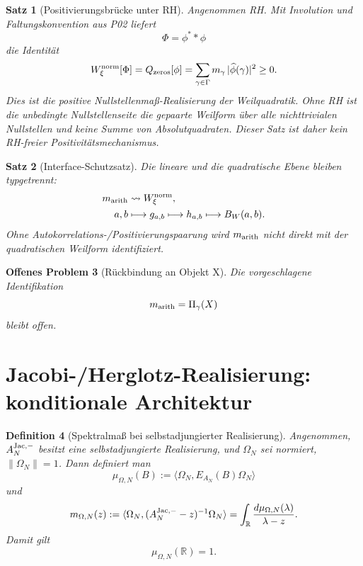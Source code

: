 \documentclass[11pt,a4paper]{amsart}
\newtheorem{theorem}{Satz}[section]
\newtheorem{definition}[theorem]{Definition}
\newtheorem{openproblem}[theorem]{Offenes Problem}
\begin{document}
\begin{theorem}[Positivierungsbrücke unter RH]
\label{thm:positivity-bridge}
Angenommen RH. Mit Involution und Faltungskonvention aus P02 liefert
\[
  \Phi=\phi^\ast *\phi
\]
die Identität
\[
  W_\xi^{\rm norm}[\Phi]
  =Q_{\rm zeros}[\phi]
  =\sum_{\gamma\in\Gamma}
    m_\gamma\,|\widehat\phi(\gamma)|^2\ge0.
\]
Dies ist die positive Nullstellenmaß-Realisierung der Weilquadratik.
Ohne RH ist die unbedingte Nullstellenseite die gepaarte Weilform über alle
nichttrivialen Nullstellen und keine Summe von Absolutquadraten. Dieser Satz
ist daher kein RH-freier Positivitätsmechanismus.
\end{theorem}

\begin{theorem}[Interface-Schutzsatz]\label{thm:interface-firewall}
Die lineare und die quadratische Ebene bleiben typgetrennt:
\[
\begin{aligned}
  m_{\rm arith}&\rightsquigarrow W_\xi^{\rm norm},\\
  a,b&\longmapsto g_{a,b}\longmapsto h_{a,b}
       \longmapsto B_W(a,b).
\end{aligned}
\]
Ohne Autokorrelations-/Positivierungspaarung wird
$m_{\rm arith}$ nicht direkt mit der quadratischen Weilform identifiziert.
\end{theorem}

\begin{openproblem}[Rückbindung an Objekt X]\label{op:pi-gamma}
Die vorgeschlagene Identifikation
\[
  m_{\rm arith}=\Pi_\gamma(X)
\]
bleibt offen.
\end{openproblem}

\section{Jacobi-/Herglotz-Realisierung: konditionale Architektur}

\begin{definition}[Spektralmaß bei selbstadjungierter Realisierung]
\label{def:spectral-measure}
Angenommen, $A_N^{\rm Jac,-}$ besitzt eine selbstadjungierte Realisierung, und
$\Omega_N$ sei normiert, $\|\Omega_N\|=1$. Dann definiert man
\[
  \mu_{\Omega,N}(B)
  :=\langle\Omega_N,E_{A_N}(B)\Omega_N\rangle
\]
und
\[
  m_{\Omega,N}(z)
  :=\langle\Omega_N,(A_N^{\rm Jac,-}-z)^{-1}\Omega_N\rangle
  =\int_{\mathbb R}\frac{d\mu_{\Omega,N}(\lambda)}{\lambda-z}.
\]
Damit gilt
\[
  \mu_{\Omega,N}(\mathbb R)=1.
\]
\end{definition}
\end{document}
